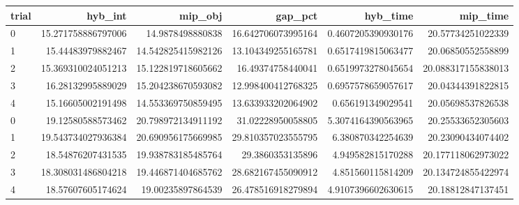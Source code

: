 \begin{tabular}{lrrrrr}
\hline
trial & hyb_int & mip_obj & gap_pct & hyb_time & mip_time \\ \hline
0 & 15.271758886797006 & 14.9878498880838 & 16.642706073995164 & 0.4607205390930176 & 20.57734251022339 \\
1 & 15.44483979882467 & 14.542825415982126 & 13.104349255165781 & 0.6517419815063477 & 20.06850552558899 \\
2 & 15.369310024051213 & 15.122819718605662 & 16.49374758440041 & 0.6519973278045654 & 20.088317155838013 \\
3 & 16.28132995889029 & 15.204238670593082 & 12.998400412768325 & 0.6957578659057617 & 20.04344391822815 \\
4 & 15.16605002191498 & 14.553369750859495 & 13.633933202064902 & 0.656191349029541 & 20.05698537826538 \\
0 & 19.12580588573462 & 20.798972134911192 & 31.02228950058805 & 5.3074164390563965 & 20.25533652305603 \\
1 & 19.543734027936384 & 20.690956175669985 & 29.810357023555795 & 6.380870342254639 & 20.23090434074402 \\
2 & 18.54876207431535 & 19.938783185485764 & 29.3860353135896 & 4.949582815170288 & 20.177118062973022 \\
3 & 18.308031486804218 & 19.446871404685762 & 28.682167455090912 & 4.851560115814209 & 20.134724855422974 \\
4 & 18.57607605174624 & 19.00235897864539 & 26.478516918279894 & 4.9107396602630615 & 20.18812847137451 \\
\hline
\end{tabular}
